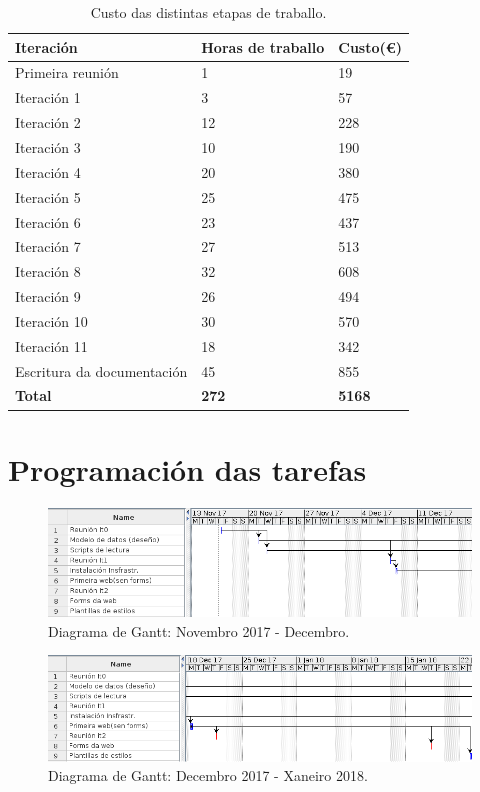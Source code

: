 \begin{table}[h]
	\centering
	\begin{tabular}{|p{5cm}|l|l|}
		\hline
		\rowcolor{blue!10}
		Iteración & Horas de traballo & Custo(€)\\
		\hline
		Primeira reunión & 1 &  19\\
		\hline
		Iteración 1 & 3 &  57\\
		\hline
		Iteración 2 & 12 &  228\\
		\hline
		Iteración 3 & 10 &  190\\
		\hline
		Iteración 4 & 20 &  380\\
		\hline
		Iteración 5 & 25 &  475\\
		\hline
		Iteración 6 & 23 &  437\\
		\hline
		Iteración 7 & 27 &  513\\
		\hline
		Iteración 8 & 32 &  608\\
		\hline
		Iteración 9 & 26 &  494\\
		\hline
		Iteración 10 & 30 &  570\\
		\hline
		Iteración 11 &  18 &  342\\
		\hline
		Escritura da documentación & 45 & 855\\
		\hline
		\textbf{Total} & \textbf{272} & \textbf{5168} \\
		\hline
	\end{tabular}
	\caption{Custo das distintas etapas de traballo.}
\label{tab:custo}
\end{table}


\section{Programación das tarefas}


\begin{figure}[H]
	\centering
	\includegraphics[scale=0.55,keepaspectratio=true]{./images/gantt/gantt1-1.png}
	\caption{Diagrama de Gantt: Novembro 2017 - Decembro.}
	\label{fig:gantt1-1}
\end{figure}

\begin{figure}[H]
	\centering
	\includegraphics[scale=0.5,keepaspectratio=true]{./images/gantt/gantt1-2.png}
	\caption{Diagrama de Gantt: Decembro 2017 - Xaneiro 2018.}
	\label{fig:gantt1-2}
\end{figure}

